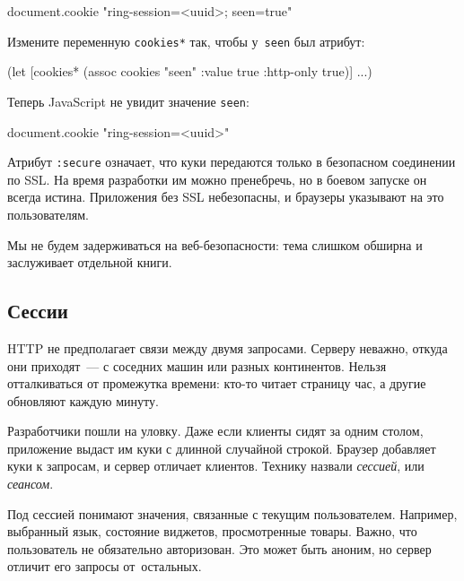 \begin{english}
  \begin{js}
document.cookie
"ring-session=<uuid>; seen=true"
  \end{js}
\end{english}

\noindent
Измените переменную \verb|cookies*| так, чтобы у~\verb|seen| был атрибут:

\begin{english}
  \begin{clojure}
(let [cookies* (assoc cookies "seen"
                      {:value true :http-only true})]
  ...)
  \end{clojure}
\end{english}

Теперь JavaScript не увидит значение \verb|seen|:

\begin{english}
  \begin{js}
document.cookie
"ring-session=<uuid>"
  \end{js}
\end{english}

Атрибут \verb|:secure| означает, что куки передаются только в безопасном
соединении по SSL. На время разработки им можно пренебречь, но в боевом запуске
он всегда истина. Приложения без SSL небезопасны, и браузеры указывают на это
пользователям.

Мы не будем задерживаться на веб-безопасности: тема слишком обширна и
заслуживает отдельной книги.

\subsection{Сессии}


HTTP не предполагает связи между двумя запросами. Серверу неважно, откуда они
приходят~--- с соседних машин или разных континентов. Нельзя отталкиваться от
промежутка времени: кто-то читает страницу час, а другие обновляют каждую
минуту.

Разработчики пошли на уловку. Даже если клиенты сидят за одним столом,
приложение выдаст им куки с длинной случайной строкой. Браузер добавляет куки к
запросам, и сервер отличает клиентов. Технику назвали \emph{сессией}, или
\emph{сеансом}.

Под сессией понимают значения, связанные с текущим пользователем. Например,
выбранный язык, состояние виджетов, просмотренные товары. Важно, что
пользователь не обязательно авторизован. Это может быть аноним, но сервер
отличит его запросы от~остальных.

